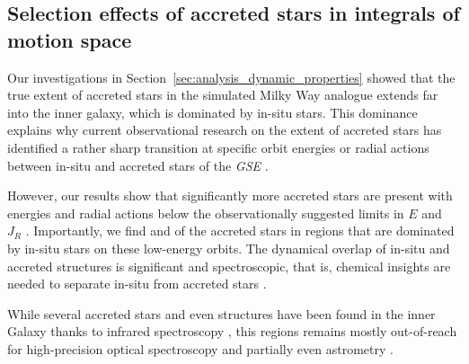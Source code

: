 \documentclass[fleqn,usenatbib]{mnras}
\begin{document}
\subsection{Selection effects of accreted stars in integrals of motion space} \label{sec:discussion_finding_accreted_stars}

Our investigations in Section~\ref{sec:analysis_dynamic_properties} showed that the true extent of accreted stars in the simulated Milky Way analogue extends far into the inner galaxy, which is dominated by in-situ stars. This dominance explains why current observational research on the extent of accreted stars has identified a rather sharp transition at specific orbit energies or radial actions between in-situ and accreted stars of the \textit{GSE} \citep{Helmi2018, Feuillet2021, Monty2024}.

However, our results show that significantly more accreted stars are present with energies and radial actions below the observationally suggested limits in $E$ \citep{Helmi2018, Monty2024} and $J_R$ \citep{Feuillet2020, Feuillet2021}. Importantly, we find  and  of the accreted stars in regions that are dominated by in-situ stars on these low-energy orbits. The dynamical overlap of in-situ and accreted structures is significant and spectroscopic, that is, chemical insights are needed to separate in-situ from accreted stars \citep[for example][]{Das2020, Horta2021, Buder2022}.

While several accreted stars and even structures have been found in the inner Galaxy thanks to infrared spectroscopy \citep[for example][]{Horta2021}, this regions remains mostly out-of-reach for high-precision optical spectroscopy and partially even astrometry \citep{Queiroz2023}.
\end{document}
